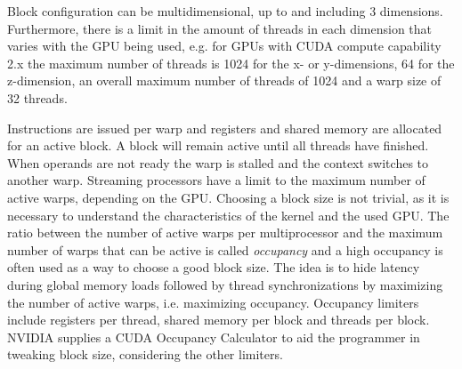 


Block configuration can be multidimensional, up to and including 3 dimensions.
Furthermore, there is a limit in the amount of threads in each dimension that varies with the GPU being used, e.g. for GPUs with CUDA compute capability 2.x  the maximum number of threads is 1024 for the x- or y-dimensions, 64 for the z-dimension, an overall maximum number of threads of 1024 and a warp size of 32 threads.

Instructions are issued per warp and registers and shared memory are allocated for an active block.
A block will remain active until all threads have finished.
When operands are not ready the warp is stalled and the context switches to another warp.
Streaming processors have a limit to the maximum number of active warps, depending on the GPU.
Choosing a block size is not trivial, as it is necessary to understand the characteristics of the kernel and the used GPU.
The ratio between the number of active warps per multiprocessor and the maximum number of warps that can be active is called \emph{occupancy} and a high occupancy is often used as a way to choose a good block size.
The idea is to hide latency during global memory loads followed by thread synchronizations by maximizing the number of active warps, i.e. maximizing occupancy.
Occupancy limiters include registers per thread, shared memory per block and threads per block.
NVIDIA supplies a CUDA Occupancy Calculator to aid the programmer in tweaking block size, considering the other limiters.


